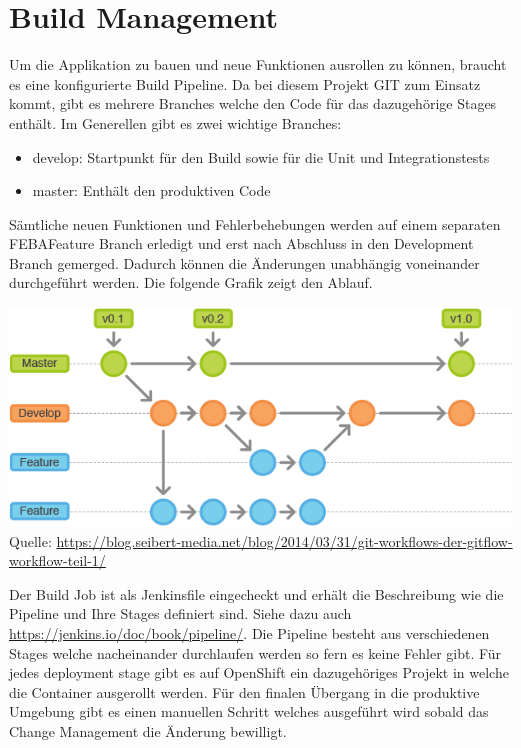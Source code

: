\section{Build Management}
\label{build}


Um die Applikation zu bauen und neue Funktionen ausrollen zu können, braucht es eine konfigurierte Build Pipeline. Da bei diesem Projekt GIT zum Einsatz kommt, gibt es mehrere Branches welche den Code für das dazugehörige Stages enthält. Im Generellen gibt es zwei wichtige Branches:
\begin{itemize}
	\item develop: Startpunkt für den Build sowie für die Unit und Integrationstests
	\item master: Enthält den produktiven Code
\end{itemize}
Sämtliche neuen Funktionen und Fehlerbehebungen werden auf einem separaten \Gls{FEBA}Feature Branch erledigt und erst nach Abschluss in den Development Branch gemerged. Dadurch können die Änderungen unabhängig voneinander durchgeführt werden. Die folgende Grafik zeigt den Ablauf.
\begin{center}
	\includegraphics[scale=0.6]{gitflow}\newline
	Quelle: \url{https://blog.seibert-media.net/blog/2014/03/31/git-workflows-der-gitflow-workflow-teil-1/}
\end{center}
Der Build Job ist als Jenkinsfile eingecheckt und erhält die Beschreibung wie die Pipeline und Ihre Stages definiert sind. Siehe dazu auch \url{https://jenkins.io/doc/book/pipeline/}. Die Pipeline besteht aus verschiedenen Stages welche nacheinander durchlaufen werden so fern es keine Fehler gibt. Für jedes deployment stage gibt es auf OpenShift ein dazugehöriges Projekt in welche die Container ausgerollt werden. Für den finalen Übergang in die produktive Umgebung gibt es einen manuellen Schritt welches ausgeführt wird sobald das Change Management die Änderung bewilligt.

